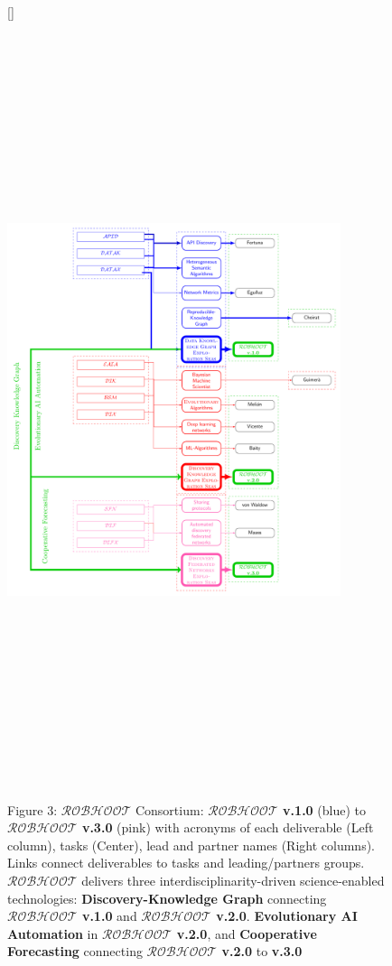 \documentclass[11pt, a4paper]{article} %
\begin{document}
\begin{figure}[h!]
  [\FBwidth]
  {\caption*{Figure 3: $\mathcal{ROBHOOT}$ Consortium: {\bf
        $\mathcal{ROBHOOT}$ v.1.0} (blue) to {\bf $\mathcal{ROBHOOT}$
        v.3.0} (pink) with acronyms of each deliverable (Left column),
      tasks (Center), lead and partner names (Right columns). Links
      connect deliverables to tasks and leading/partners
      groups. $\mathcal{ROBHOOT}$ delivers three
      interdisciplinarity-driven science-enabled technologies: {\bf
        Discovery-Knowledge Graph} connecting {\bf $\mathcal{ROBHOOT}$
        v.1.0} and {\bf $\mathcal{ROBHOOT}$ v.2.0}. {\bf Evolutionary
        AI Automation} in {\bf $\mathcal{ROBHOOT}$ v.2.0}, and {\bf
        Cooperative Forecasting} connecting {\bf $\mathcal{ROBHOOT}$
        v.2.0} to {\bf v.3.0}}}
  {\includegraphics[width=9.75cm,height=22cm]{Figures/Consortium.pdf}}
\end{figure}
  
\end{document}
